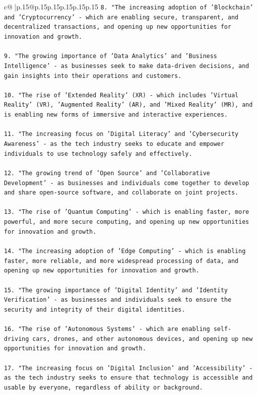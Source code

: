 \documentclass{article}
\begin{document}
{\begin{supertabular}{c@{$\;$}|p{.15\linewidth}@{}p{.15\linewidth}p{.15\linewidth}p{.15\linewidth}p{.15\linewidth}p{.15\linewidth}}
{{{\texttt{8. "The increasing adoption of 'Blockchain' and 'Cryptocurrency' {-} which are enabling secure, transparent, and decentralized transactions, and opening up new opportunities for innovation and growth.} \\
\\ 
\texttt{9. "The growing importance of 'Data Analytics' and 'Business Intelligence' {-} as businesses seek to make data{-}driven decisions, and gain insights into their operations and customers.} \\
\\ 
\texttt{10. "The rise of 'Extended Reality' (XR) {-} which includes 'Virtual Reality' (VR), 'Augmented Reality' (AR), and 'Mixed Reality' (MR), and is enabling new forms of immersive and interactive experiences.} \\
\\ 
\texttt{11. "The increasing focus on 'Digital Literacy' and 'Cybersecurity Awareness' {-} as the tech industry seeks to educate and empower individuals to use technology safely and effectively.} \\
\\ 
\texttt{12. "The growing trend of 'Open Source' and 'Collaborative Development' {-} as businesses and individuals come together to develop and share open{-}source software, and collaborate on joint projects.} \\
\\ 
\texttt{13. "The rise of 'Quantum Computing' {-} which is enabling faster, more powerful, and more secure computing, and opening up new opportunities for innovation and growth.} \\
\\ 
\texttt{14. "The increasing adoption of 'Edge Computing' {-} which is enabling faster, more reliable, and more widespread processing of data, and opening up new opportunities for innovation and growth.} \\
\\ 
\texttt{15. "The growing importance of 'Digital Identity' and 'Identity Verification' {-} as businesses and individuals seek to ensure the security and integrity of their digital identities.} \\
\\ 
\texttt{16. "The rise of 'Autonomous Systems' {-} which are enabling self{-}driving cars, drones, and other autonomous devices, and opening up new opportunities for innovation and growth.} \\
\\ 
\texttt{17. "The increasing focus on 'Digital Inclusion' and 'Accessibility' {-} as the tech industry seeks to ensure that technology is accessible and usable by everyone, regardless of ability or background.} \\
}}}
\end{supertabular}}
\end{document}
